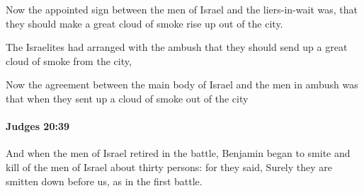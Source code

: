 			\begin{versebox}
					\item[BHS] 
					\item[ASV] Now the appointed sign between the men of Israel and the liers-in-wait was, that they should make a great cloud of smoke rise up out of the city.
					\item[NIV] The Israelites had arranged with the ambush that they should send up a great cloud of smoke from the city,
					\item[NRSV] Now the agreement between the main body of Israel and the men in ambush was that when they sent up a cloud of smoke out of the city
			\end{versebox}

		\paragraph{Judges 20:39} %
			\label{JUDGES-20-39}

			And when the men of Israel retired in the battle, Benjamin began to smite and kill of the men of Israel about thirty persons: for they said, Surely they are smitten down before us, as in the first battle.

